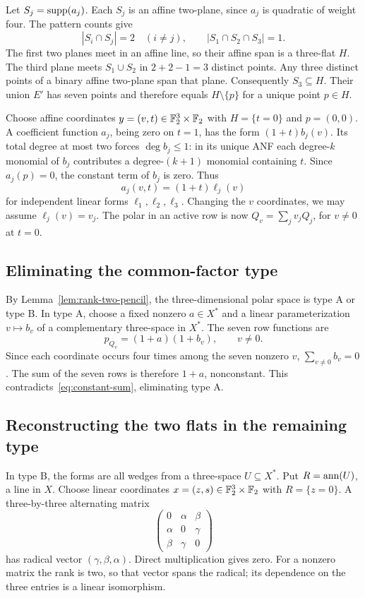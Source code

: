 Let $S_j=\operatorname{supp}(a_j)$. Each $S_j$ is an affine two-plane, since $a_j$ is quadratic of weight four. The pattern counts give
\[
|S_i\cap S_j|=2\quad(i\ne j),\qquad |S_1\cap S_2\cap S_3|=1.
\]
The first two planes meet in an affine line, so their affine span is a three-flat $H$. The third plane meets $S_1\cup S_2$ in $2+2-1=3$ distinct points. Any three distinct points of a binary affine two-plane span that plane. Consequently $S_3\subseteq H$. Their union $E'$ has seven points and therefore equals $H\setminus\{p\}$ for a unique point $p\in H$.

Choose affine coordinates $y=(v,t)\in\mathbb F_2^3\times\mathbb F_2$ with $H=\{t=0\}$ and $p=(0,0)$. A coefficient function $a_j$, being zero on $t=1$, has the form $(1+t)b_j(v)$. Its total degree at most two forces $\deg b_j\le1$: in its unique ANF each degree-$k$ monomial of $b_j$ contributes a degree-$(k+1)$ monomial containing $t$. Since $a_j(p)=0$, the constant term of $b_j$ is zero. Thus
\[
a_j(v,t)=(1+t)\ell_j(v)
\]
for independent linear forms $\ell_1,\ell_2,\ell_3$. Changing the $v$ coordinates, we may assume $\ell_j(v)=v_j$. The polar in an active row is now $Q_v=\sum_jv_jQ_j$, for $v\ne0$ at $t=0$.

\subsection{Eliminating the common-factor type}
By Lemma~\ref{lem:rank-two-pencil}, the three-dimensional polar space is type A or type B. In type A, choose a fixed nonzero $a\in X^*$ and a linear parameterization $v\mapsto b_v$ of a complementary three-space in $X^*$. The seven row functions are
\[
p_{Q_v}=(1+a)(1+b_v),\qquad v\ne0.
\]
Since each coordinate occurs four times among the seven nonzero $v$, $\sum_{v\ne0}b_v=0$. The sum of the seven rows is therefore $1+a$, nonconstant. This contradicts~\eqref{eq:constant-sum}, eliminating type A.

\subsection{Reconstructing the two flats in the remaining type}
In type B, the forms are all wedges from a three-space $U\subseteq X^*$. Put $R=\operatorname{ann}(U)$, a line in $X$. Choose linear coordinates $x=(z,s)\in\mathbb F_2^3\times\mathbb F_2$ with $R=\{z=0\}$. A three-by-three alternating matrix
\[
\begin{pmatrix}
0&\alpha&\beta\\
\alpha&0&\gamma\\
\beta&\gamma&0
\end{pmatrix}
\]
has radical vector $(\gamma,\beta,\alpha)$. Direct multiplication gives zero. For a nonzero matrix the rank is two, so that vector spans the radical; its dependence on the three entries is a linear isomorphism.

